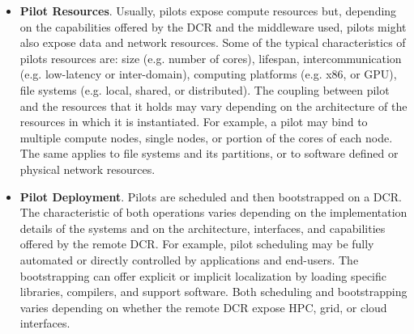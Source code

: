 \documentclass{sig-alternate}
\begin{document}
\begin{itemize}

\item \textbf{Pilot Resources}. Usually, pilots expose compute resources but,
  depending on the capabilities offered by the DCR and the middleware used,
  pilots might also expose data and network resources. Some of the typical
  characteristics of pilots resources are: size (e.g. number of cores),
  lifespan, intercommunication (e.g. low-latency or inter-domain), computing
  platforms (e.g. x86, or GPU), file systems (e.g. local, shared, or
  distributed). The coupling between pilot and the resources that it holds may
  vary depending on the architecture of the resources in which it is
  instantiated. For example, a pilot may bind to multiple compute nodes, single
  nodes, or portion of the cores of each node. The same applies to file systems
  and its partitions, or to software defined or physical network resources.


\item \textbf{Pilot Deployment}. Pilots are scheduled and then bootstrapped on
  a DCR. The characteristic of both operations varies depending on the
  implementation details of the \pilot systems and on the architecture,
  interfaces, and capabilities offered by the remote DCR. For example, pilot
  scheduling may be fully automated or directly controlled by applications and
  end-users. The bootstrapping can offer explicit or implicit localization by
  loading specific libraries, compilers, and support software. Both
  scheduling and bootstrapping varies depending on whether the remote DCR expose
  HPC, grid, or cloud interfaces.  


\end{itemize}
\end{document}
